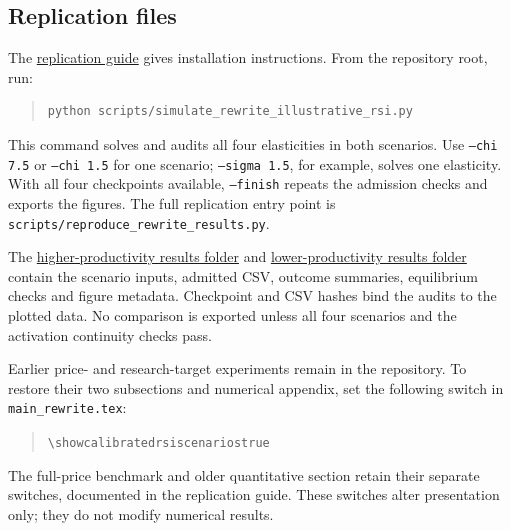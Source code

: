 
\ifshowfullpricebenchmark

\fi

\subsection{Replication files}

The \href{https://github.com/oliverpardo1979/AI-Future-Paper-WTF/blob/main/REPLICATION.md}
{replication guide} gives installation instructions. From the repository
root, run:
\begin{quote}
\small
\begin{verbatim}
python scripts/simulate_rewrite_illustrative_rsi.py
\end{verbatim}
\end{quote}
This command solves and audits all four elasticities in both scenarios.
Use \texttt{--chi 7.5} or \texttt{--chi 1.5} for one scenario;
\texttt{--sigma 1.5}, for example, solves one elasticity. With all four
checkpoints available, \texttt{--finish} repeats the admission checks
and exports the figures. The full replication entry point is
\texttt{scripts/reproduce\_rewrite\_results.py}.

The \href{https://github.com/oliverpardo1979/AI-Future-Paper-WTF/tree/main/numerical_rewrite/rsi_chi_7_5}
{higher-productivity results folder} and
\href{https://github.com/oliverpardo1979/AI-Future-Paper-WTF/tree/main/numerical_rewrite/rsi_chi_1_5}
{lower-productivity results folder} contain the scenario inputs, admitted
CSV, outcome summaries, equilibrium checks and figure metadata.
Checkpoint and CSV hashes bind the audits to the plotted data.
No comparison is exported unless all four scenarios and the activation
continuity checks pass.

Earlier price- and research-target experiments remain in the repository.
To restore their two subsections and numerical appendix, set the following
switch in \texttt{main\_rewrite.tex}:
\begin{quote}
\small
\verb|\showcalibratedrsiscenariostrue|
\end{quote}
The full-price benchmark and older quantitative section retain
their separate switches, documented in the replication guide. These
switches alter presentation only; they do not modify numerical results.
